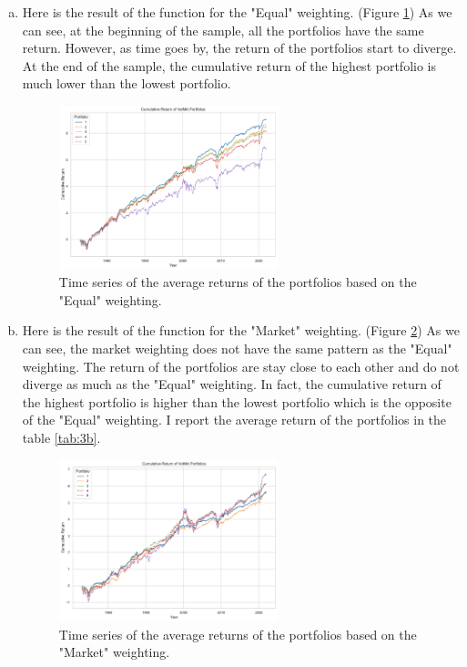 \begin{enumerate}[(a)]
\item Here is the result of the function for the "Equal" weighting. (Figure \ref{fig:3a}) As we can see, at the beginning of the sample, all the portfolios have the same return. However, as time goes by, the return of the portfolios start to diverge. At the end of the sample, the cumulative return of the highest portfolio is much lower than the lowest portfolio. 
\begin{figure}[htbp!]
    \centering
    \includegraphics[width=0.6\textwidth]{Out/3_1.pdf}
    \caption{Time series of the average returns of the portfolios based on the "Equal" weighting.}
    \label{fig:3a}
\end{figure}

\item Here is the result of the function for the "Market" weighting. (Figure \ref{fig:3b}) As we can see, the market weighting does not have the same pattern as the "Equal" weighting. The return of the portfolios are stay close to each other and do not diverge as much as the "Equal" weighting. In fact, the cumulative return of the highest portfolio is higher than the lowest portfolio which is the opposite of the "Equal" weighting. I report the average return of the portfolios in the table \ref{tab:3b}.
\begin{figure}
    \centering
    \includegraphics[width=0.6\textwidth]{Out/3_2.pdf}
    \caption{Time series of the average returns of the portfolios based on the "Market" weighting.}
    \label{fig:3b}
\end{figure}


\end{enumerate}
